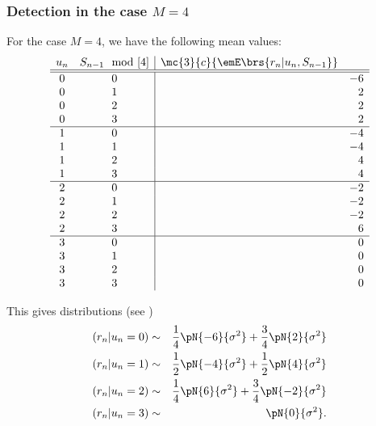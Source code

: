 \subsubsection{Detection in the case $M=4$}
For the case $M=4$, we have the following mean values:
\[
\begin{array}{cc|rrr}
   u_n & S_{n-1}\mod[4] & \mc{3}{c}{\emE\brs{r_n|u_n,S_{n-1}}} \\
   \hline
   \hline
   0 & 0 && -6 \\
   0 & 1 &&  2 \\
   0 & 2 &&  2 \\
   0 & 3 &&  2 \\
\hline
   1 & 0 && -4 \\
   1 & 1 && -4 \\
   1 & 2 &&  4 \\
   1 & 3 &&  4 \\
\hline
   2 & 0 && -2 \\
   2 & 1 && -2 \\
   2 & 2 && -2 \\
   2 & 3 &&  6 \\
\hline
   3 & 0 &&  0 \\
   3 & 1 &&  0 \\
   3 & 2 &&  0 \\
   3 & 3 &&  0
\end{array}
\]

This gives distributions (see )
\begin{eqnarray*}
   (r_n|u_n=0) &\sim& \frac{1}{4}\pN{-6}{\sigma^2}+\frac{3}{4}\pN{2}{\sigma^2} \\
   (r_n|u_n=1) &\sim& \frac{1}{2}\pN{-4}{\sigma^2}+\frac{1}{2}\pN{4}{\sigma^2} \\
   (r_n|u_n=2) &\sim& \frac{1}{4}\pN{ 6}{\sigma^2}+\frac{3}{4}\pN{-2}{\sigma^2} \\
   (r_n|u_n=3) &\sim& \pN{ 0}{\sigma^2}.
\end{eqnarray*}


